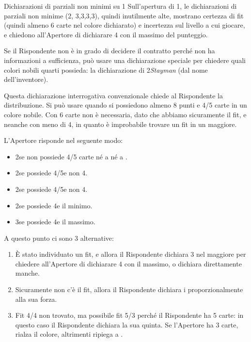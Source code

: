 \documentclass[../corsofiori.tex]{subfiles}
\begin{document}
\vspace{1cm}

\begin{regola}{Dichiarazioni di parziali non minimi su 1\SA}\label{reg:nonmin}
    Sull'apertura di 1\SA, le dichiarazioni di parziali non minime (2\SA, 3\Cl,3\Di,3\He,3\Sp), quindi inutilmente alte,
    mostrano certezza di fit (quindi almeno 6 carte nel colore dichiarato) e incertezza
    sul livello a cui giocare, e chiedono all'Apertore di dichiarare 4 con il massimo del punteggio.
\end{regola}

Se il Rispondente non è in grado di decidere il contratto perché non ha informazioni a sufficienza, può usare una
dichiarazione speciale per chiedere quali colori nobili quarti possieda: la dichiarazione di 2\Cl \emph{Stayman} (dal
nome dell'inventore).

Questa dichiarazione interrogativa convenzionale chiede al Rispondente la distribuzione. Si può usare quando si
possiedono almeno 8 punti e 4/5 carte in un colore nobile. Con 6 carte non è necessaria, dato che abbiamo sicuramente il
fit, e neanche con meno di 4, in quanto è improbabile trovare un fit in un maggiore.

L'Apertore risponde nel seguente modo:
\begin{itemize}
    \item 2\Di se non possiede 4/5 carte né a \cu né a \pic.
    \item 2\He se possiede 4/5\He e non 4\He.
    \item 2\Sp se possiede 4/5\Sp e non 4\Sp.
    \item 2\SA se possiede 4\He e il minimo.
    \item 3\Cl se possiede 4\He e il massimo.
\end{itemize}

A questo punto ci sono 3 alternative:
\begin{enumerate}
    \item \`E stato individuato un fit, e allora il Rispondente dichiara 3 nel maggiore per chiedere all'Apertore di
        dichiarare 4 con il massimo, o dichiara direttamente manche.
    \item Sicuramente non c'è il fit, allora il Rispondente dichiara i \SA proporzionalmente alla sua forza.
    \item Fit 4/4 non trovato, ma possibile fit 5/3 perché il Rispondente ha 5 carte: in questo caso il Rispondente
        dichiara la sua quinta. Se l'Apertore ha 3 carte, rialza il colore, altrimenti ripiega a \SA.
\end{enumerate}
\end{document}
